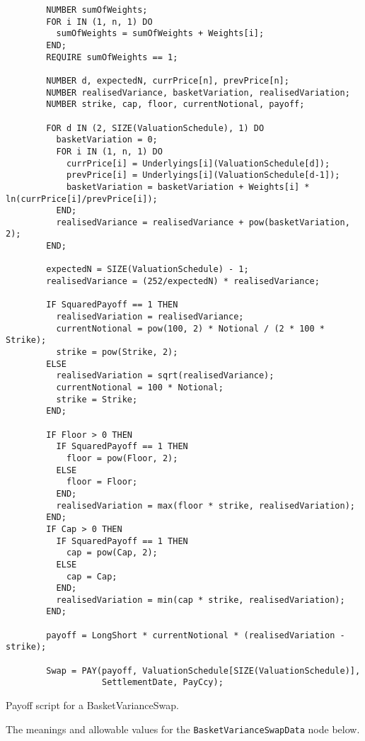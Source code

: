\begin{listing}[hbt]
\begin{verbatim}
        NUMBER sumOfWeights;
        FOR i IN (1, n, 1) DO
          sumOfWeights = sumOfWeights + Weights[i];
        END;
        REQUIRE sumOfWeights == 1;

        NUMBER d, expectedN, currPrice[n], prevPrice[n];
        NUMBER realisedVariance, basketVariation, realisedVariation;
        NUMBER strike, cap, floor, currentNotional, payoff;

        FOR d IN (2, SIZE(ValuationSchedule), 1) DO
          basketVariation = 0;
          FOR i IN (1, n, 1) DO
            currPrice[i] = Underlyings[i](ValuationSchedule[d]);
            prevPrice[i] = Underlyings[i](ValuationSchedule[d-1]);
            basketVariation = basketVariation + Weights[i] * ln(currPrice[i]/prevPrice[i]);
          END;
          realisedVariance = realisedVariance + pow(basketVariation, 2);
        END;

        expectedN = SIZE(ValuationSchedule) - 1;
        realisedVariance = (252/expectedN) * realisedVariance;

        IF SquaredPayoff == 1 THEN
          realisedVariation = realisedVariance;
          currentNotional = pow(100, 2) * Notional / (2 * 100 * Strike);
          strike = pow(Strike, 2);
        ELSE
          realisedVariation = sqrt(realisedVariance);
          currentNotional = 100 * Notional;
          strike = Strike;
        END;

        IF Floor > 0 THEN
          IF SquaredPayoff == 1 THEN
            floor = pow(Floor, 2);
          ELSE
            floor = Floor;
          END;
          realisedVariation = max(floor * strike, realisedVariation);
        END;
        IF Cap > 0 THEN
          IF SquaredPayoff == 1 THEN
            cap = pow(Cap, 2);
          ELSE
            cap = Cap;
          END;
          realisedVariation = min(cap * strike, realisedVariation);
        END;

        payoff = LongShort * currentNotional * (realisedVariation - strike);

        Swap = PAY(payoff, ValuationSchedule[SIZE(ValuationSchedule)],
                   SettlementDate, PayCcy);
\end{verbatim}
\caption{Payoff script for a BasketVarianceSwap.}
\label{lst:basket_variance_swap}
\end{listing}

The meanings and allowable values for the \lstinline!BasketVarianceSwapData! node below.

